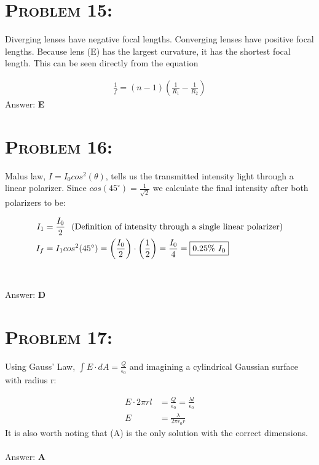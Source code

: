 \documentclass{article}
\begin{document}
\section{\textsc{Problem 15:}} Diverging lenses have negative focal lengths. Converging lenses have positive focal lengths. Because lens (E) has the largest curvature, it has the shortest focal length. This can be seen directly from the equation

\begin{align}
\frac{1}{f} = (n-1)\left(\frac{1}{R_{1}}-\frac{1}{R_{2}}\right)
\end{align}
Answer: \textbf{\textcolor{ProcessBlue}E}\\


\section{\textsc{Problem 16:}} Malus law, $I = I_0 cos^2(\theta)$, tells us the transmitted intensity light through a linear polarizer. Since $cos(45^{\circ}) = \frac{1}{\sqrt{2}}$ we calculate the final intensity after both polarizers to be:

\begin{align}
I_1 &= \frac{I_0}{2} \hspace{.1in} \text{(Definition of intensity through a single linear polarizer)}\\
I_f &= I_1 cos^2(45^{\circ}) = \left(\frac{I_0}{2}\right) \cdot \left( \frac{1}{2}\right) = \frac{I_{0}}{4} = \boxed{0.25\% \hspace{.05in} I_{0} }\nonumber
\end{align}
\\\\
Answer: \textbf{\textcolor{ProcessBlue}D}\\


\section{\textsc{Problem 17:}} Using Gauss' Law, $\int E \cdot dA = \frac{Q}{\epsilon_0}$ and imagining a cylindrical Gaussian surface with radius r:

\begin{align}
E \cdot 2 \pi r l &= \frac{Q}{\epsilon_0} = \frac{\lambda l}{\epsilon_0}\nonumber\\
E &= \boxed{\frac{\lambda}{2 \pi \epsilon_0 r}}\nonumber
\end{align}
It is also worth noting that (A) is the only solution with the correct dimensions.
\\\\
Answer: \textbf{\textcolor{ProcessBlue}A}\\
\end{document}
